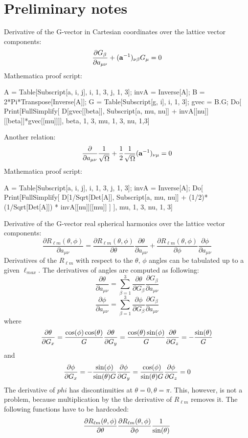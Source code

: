 \hypertarget{sym_section1}{}\section{Preliminary notes}\label{sym_section1}
Derivative of the G-\/vector in Cartesian coordinates over the lattice vector components\+: \[ \frac{\partial G_{\beta}}{\partial a_{\mu\nu}} + ({\bf a}^{-1})_{\nu \beta} G_{\mu} = 0 \] Mathematica proof script\+: \begin{DoxyVerb}A = Table[Subscript[a, i, j], {i, 1, 3}, {j, 1, 3}];
invA = Inverse[A];
B = 2*Pi*Transpose[Inverse[A]];
G = Table[Subscript[g, i], {i, 1, 3}];
gvec = B.G;
Do[
  Print[FullSimplify[
   D[gvec[[beta]], Subscript[a, mu, nu]] + invA[[nu]][[beta]]*gvec[[mu]]]],
{beta, 1, 3}, {mu, 1, 3}, {nu, 1,3}]
\end{DoxyVerb}
 Another relation\+: \[ \frac{\partial}{\partial a_{\mu \nu}} \frac{1}{\sqrt{\Omega}} + \frac{1}{2} \frac{1}{\sqrt{\Omega}} ({\bf a}^{-1})_{\nu \mu} = 0 \] Mathematica proof script\+: \begin{DoxyVerb}A = Table[Subscript[a, i, j], {i, 1, 3}, {j, 1, 3}];
invA = Inverse[A];
Do[
 Print[FullSimplify[
   D[1/Sqrt[Det[A]], Subscript[a, mu, nu]] + (1/2)*(1/Sqrt[Det[A]]) * invA[[nu]][[mu]]
   ]
  ],
{mu, 1, 3}, {nu, 1, 3}]
\end{DoxyVerb}


Derivative of the G-\/vector real spherical harmonics over the lattice vector components\+: \[ \frac{\partial R_{\ell m}(\theta, \phi)}{\partial a_{\mu \nu}} = \frac{\partial R_{\ell m}(\theta, \phi)}{\partial \theta} \frac{\partial \theta} {\partial a_{\mu \nu}} + \frac{\partial R_{\ell m}(\theta, \phi)}{\partial \phi} \frac{\partial \phi} {\partial a_{\mu \nu}} \] Derivatives of the $ R_{\ell m} $ with respect to the $ \theta,\, \phi$ angles can be tabulated up to a given $ \ell_{max} $. The derivatives of angles are computed as following\+: \[ \frac{\partial \theta} {\partial a_{\mu \nu}} = \sum_{\beta=1}^{3} \frac{\partial \theta}{\partial G_{\beta}} \frac{\partial G_{\beta}} {\partial a_{\mu \nu}} \] \[ \frac{\partial \phi} {\partial a_{\mu \nu}} = \sum_{\beta=1}^{3} \frac{\partial \phi}{\partial G_{\beta}} \frac{\partial G_{\beta}} {\partial a_{\mu \nu}} \] where \[ \frac{\partial \theta}{\partial G_{x}} = \frac{\cos(\phi) \cos(\theta)}{G} \\ \frac{\partial \theta}{\partial G_{y}} = \frac{\cos(\theta) \sin(\phi)}{G} \\ \frac{\partial \theta}{\partial G_{z}} = -\frac{\sin(\theta)}{G} \] and \[ \frac{\partial \phi}{\partial G_{x}} = -\frac{\sin(\phi)}{\sin(\theta) G} \\ \frac{\partial \phi}{\partial G_{y}} = \frac{\cos(\phi)}{\sin(\theta) G} \\ \frac{\partial \phi}{\partial G_{z}} = 0 \] The derivative of $ phi $ has discontinuities at $ \theta = 0, \theta=\pi $. This, however, is not a problem, because multiplication by the the derivative of $ R_{\ell m} $ removes it. The following functions have to be hardcoded\+: \[ \frac{\partial R_{\ell m}(\theta, \phi)}{\partial \theta} \\ \frac{\partial R_{\ell m}(\theta, \phi)}{\partial \phi} \frac{1}{\sin(\theta)} \]

